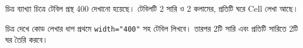 \par\noindent
\begin{minipage}[t]{.48\linewidth}\vspace{0pt}
\begin{keypointbox}{চিত্র ব্যাখ্যা}
চিত্রে টেবিল প্রস্থ 400 দেখানো হয়েছে। টেবিলটি 2 সারি ও 2 কলামের, প্রতিটি ঘরে Cell লেখা আছে।
\end{keypointbox}
\end{minipage}\hfill
\begin{minipage}[t]{.48\linewidth}\vspace{0pt}
\begin{keypointbox}{চিত্র দেখে কোড লেখার ধাপ}
প্রথমে \texttt{width="400"} সহ টেবিল লিখবে। তারপর 2টি সারি এবং প্রতিটি সারিতে 2টি ঘর তৈরি করবে।
\end{keypointbox}
\end{minipage}\par\smallskip




